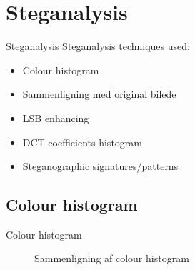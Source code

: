 \section{Steganalysis}
\begin{frame}{Steganalysis}{}
	Steganalysis techniques used:
	\begin{itemize}
		\item Colour histogram
		\item Sammenligning med original bilede
		\item LSB enhancing
		\item DCT coefficients histogram
		\item Steganographic signatures/patterns
	\end{itemize}
\end{frame}

\subsection{Colour histogram} %
\begin{frame}{Colour histogram}{}
\begin{figure}
\centering     %
{}
\end{figure}
\begin{figure}
\centering
{}
\caption{Sammenligning af colour histogram}
\end{figure}
\end{frame}

